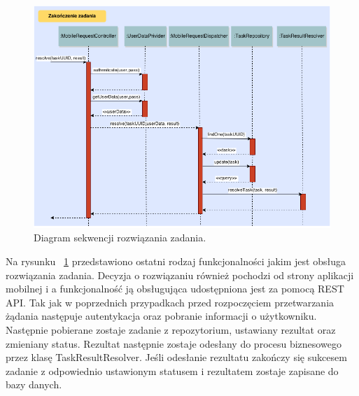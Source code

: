 \begin{figure}[h]
\centerline{\includegraphics[scale=0.5]{resolveTaskFlow}}
\caption{Diagram sekwencji rozwiązania zadania.}
\label{fig:resolveTaskFlow}
\end{figure}

Na rysunku ~\ref{fig:resolveTaskFlow} przedstawiono ostatni rodzaj funkcjonalności jakim jest obsługa rozwiązania zadania. Decyzja o rozwiązaniu również pochodzi od strony aplikacji mobilnej i a funkcjonalność ją obsługująca udostępniona jest za pomocą REST API. Tak jak w poprzednich przypadkach przed rozpoczęciem przetwarzania żądania następuje autentykacja oraz pobranie informacji o użytkowniku. Następnie pobierane zostaje zadanie z repozytorium, ustawiany rezultat oraz zmieniany status. Rezultat następnie zostaje odesłany do procesu biznesowego przez klasę TaskResultResolver. Jeśli odesłanie rezultatu zakończy się sukcesem zadanie z odpowiednio ustawionym statusem i rezultatem zostaje zapisane do bazy danych.




